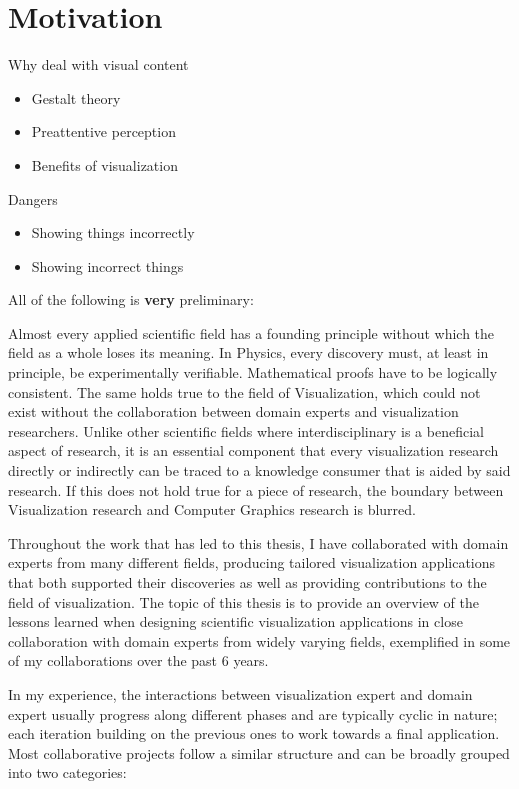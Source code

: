 \chapter{Motivation}
\label{ch:motivation}

Why deal with visual content
\begin{itemize}
\item Gestalt theory
\item Preattentive perception
\item Benefits of visualization
\end{itemize}

Dangers
\begin{itemize}
\item Showing things incorrectly
\item Showing incorrect things
\end{itemize}

All of the following is \textbf{very} preliminary:


 Almost every applied scientific field has a founding principle without which the field as a whole loses its meaning. In Physics, every discovery must, at least in principle, be experimentally verifiable. Mathematical proofs have to be logically consistent. The same holds true to the field of Visualization, which could not exist without the collaboration between domain experts and visualization researchers. Unlike other scientific fields where interdisciplinary is a beneficial aspect of research, it is an essential component that every visualization research directly or indirectly can be traced to a knowledge consumer that is aided by said research. If this does not hold true for a piece of research, the boundary between Visualization research and Computer Graphics research is blurred.

Throughout the work that has led to this thesis, I have collaborated with domain experts from many different fields, producing tailored visualization applications that both supported their discoveries as well as providing contributions to the field of visualization. The topic of this thesis is to provide an overview of the lessons learned when designing scientific visualization applications in close collaboration with domain experts from widely varying fields, exemplified in some of my collaborations over the past 6 years.

In my experience, the interactions between visualization expert and domain expert usually progress along different phases and are typically cyclic in nature; each iteration building on the previous ones to work towards a final application. Most collaborative projects follow a similar structure and can be broadly grouped into two categories:

